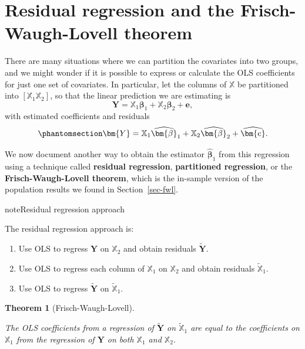 \documentclass[
  13pt,
  letterpaper,
  DIV=11,
  numbers=noendperiod]{scrreprt}
\providecommand{\tightlist}{%
  \setlength{\itemsep}{0pt}\setlength{\parskip}{0pt}}
\newcommand{\mb}{\bm}
\newcommand{\Xmat}{\mathbb{X}}
\newcommand{\bfbeta}{\mb{\beta}}
\newcommand{\bhat}{\widehat{\mb{\beta}}}
\theoremstyle{plain}
\newtheorem{theorem}{Theorem}[chapter]
\theoremstyle{plain}
\theoremstyle{definition}
\theoremstyle{definition}
\theoremstyle{remark}
\begin{document}
\section{Residual regression and the Frisch-Waugh-Lovell
theorem}\label{sec-residual-regression}

There are many situations where we can partition the covariates into two
groups, and we might wonder if it is possible to express or calculate
the OLS coefficients for just one set of covariates. In particular, let
the columns of \(\Xmat\) be partitioned into \([\Xmat_{1} \Xmat_{2}]\),
so that the linear prediction we are estimating is \[ 
\mb{Y} = \Xmat_{1}\bfbeta_{1} + \Xmat_{2}\bfbeta_{2} + \mb{e}, 
\] with estimated coefficients and residuals
\begin{equation}\protect\phantomsection\label{eq-ols-long}{ 
\mb{Y} = \Xmat_{1}\bhat_{1} + \Xmat_{2}\bhat_{2} + \widehat{\mb{e}}.
}\end{equation}

We now document another way to obtain the estimator \(\bhat_1\) from
this regression using a technique called \textbf{residual regression},
\textbf{partitioned regression}, or the \textbf{Frisch-Waugh-Lovell
theorem}, which is the in-sample version of the population results we
found in Section~\ref{sec-fwl}.

\begin{bookcallout}{note}{Residual regression approach}

The residual regression approach is:

\begin{enumerate}
\def\labelenumi{\arabic{enumi}.}
\tightlist
\item
  Use OLS to regress \(\mb{Y}\) on \(\Xmat_2\) and obtain residuals
  \(\widetilde{\mb{Y}}\).
\item
  Use OLS to regress each column of \(\Xmat_1\) on \(\Xmat_2\) and
  obtain residuals \(\widetilde{\Xmat}_1\).
\item
  Use OLS to regress \(\widetilde{\mb{Y}}\) on \(\widetilde{\Xmat}_1\).
\end{enumerate}

\end{bookcallout}

\begin{theorem}[Frisch-Waugh-Lovell]\protect\hypertarget{thm-fwl}{}\label{thm-fwl}

The OLS coefficients from a regression of \(\widetilde{\mb{Y}}\) on
\(\widetilde{\Xmat}_1\) are equal to the coefficients on \(\Xmat_{1}\)
from the regression of \(\mb{Y}\) on both \(\Xmat_{1}\) and \(\Xmat_2\).

\end{theorem}
\end{document}

